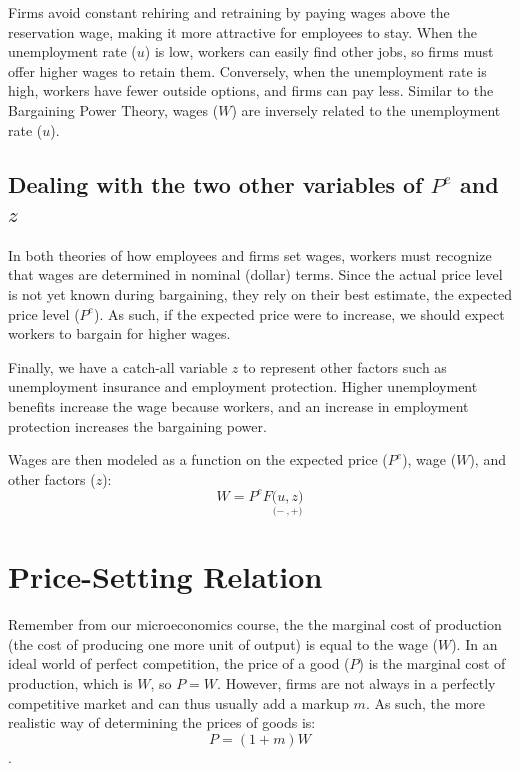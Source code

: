 \documentclass{extarticle}
\begin{document}
Firms avoid constant rehiring and retraining by paying wages above the reservation wage, making it more attractive for employees to stay. 
When the unemployment rate ($u$) is low, workers can easily find other jobs, so firms must offer higher wages to retain them. 
Conversely, when the unemployment rate is high, workers have fewer outside options, and firms can pay less. 
Similar to the Bargaining Power Theory, wages ($W$) are inversely related to the unemployment rate ($u$).

\subsection{Dealing with the two other variables of $P^e$ and $z$}
In both theories of how employees and firms set wages, workers must recognize that wages are determined in nominal (dollar) terms. 
Since the actual price level is not yet known during bargaining, they rely on their best estimate, the expected price level ($P^e$). As such, if the expected price were to increase, we should expect workers to bargain for higher wages.

Finally, we have a catch-all variable $z$ to represent other factors such as unemployment insurance and employment protection. Higher unemployment benefits increase the wage because workers, and an increase in employment protection increases the bargaining power.

Wages are then modeled as a function on the expected price ($P^e$), wage ($W$), and other factors ($z$):
$$W = P^e F\underset{(-}{(u}\underset{, +)}{, z)} $$

\section{Price-Setting Relation}
Remember from our microeconomics course, the the marginal cost of production (the cost
of producing one more unit of output) is equal to the wage ($W$). In an ideal world of perfect competition, the price of a good ($P$) is the marginal cost of production, which is $W$, so $P = W$. However, firms are not always in a perfectly competitive market and can thus usually add a markup $m$. As such, the more realistic way of determining the prices of goods is:
$$P = (1+m) W$$.
\end{document}

